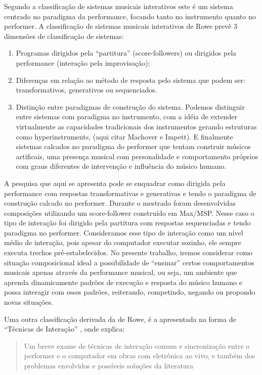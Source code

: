 \documentclass[draft]{ppgmus}
\begin{document}
Segundo a classificação de sistemas musicais interativos \cite{rowe93:interactive}
este é um sistema centrado no paradigma da performance, focando tanto
no instrumento quanto no performer. A classificação de sistemas
musicais interativos de Rowe prevê 3 dimensões de classificação de
sistemas:

\begin{enumerate}
\item Programas dirigidos pela ``partitura'' (score-followers) ou
  dirigidos pela performance (interação pela improvisação);
\item Diferenças em relação ao método de resposta pelo sistema que
  podem ser: transformativos, generativos ou sequenciados.
\item Distinção entre paradigmas de construção do sistema. Podemos
  distinguir entre sistemas com paradigma no instrumento, com a idéia
  de extender virtualmente as capacidades tradicionais dos
  instrumentos gerando estruturas como hyperinstruments, (aqui citar
  Machover e Impett). E finalmente sistemas calcados no paradigma do
  performer que tentam construir músicos artificais, uma presença
  musical com personalidade e comportamento próprios com graus
  diferentes de intervenção e influência do músico humano.
\end{enumerate}

A pesquisa que aqui se apresenta pode se enquadrar como dirigida pela
performance com respostas transformativas e generativas e tendo o
paradigma de construção calcado no performer. Durante o mestrado foram
desenvolvidas composições utilizando um score-follower construído em
Max/MSP. Nesse caso o tipo de interação foi dirigido pela partitura
com respostas sequenciadas e tendo paradigma no performer.
Consideramos esse tipo de interação como um nível médio de interação,
pois apesar do computador executar sozinho, ele sempre executa trechos
pré-estabelecidos. No presente trabalho, iremos considerar como
situação composicional ideal a possibilidade de “ensinar” certos
comportamentos musicais apenas através da performance musical, ou
seja, um ambiente que aprenda dinamicamente padrões de execução e
resposta do músico humano e possa interagir com esses padrões,
reiterando, competindo, negando ou propondo novas situações.

Uma outra classificação derivada da de Rowe, é a apresentada na forma
de ``Técnicas de Interação'' \cite{pestova:tese}, onde  explica:
\begin{quote}
 Um breve exame de técnicas de interação comum e sincronização entre o
performer e o computador em obras com eletrônica ao vivo, e também dos problemas
envolvidos e possíveis soluções da literatura
\end{quote} 
\end{document}
